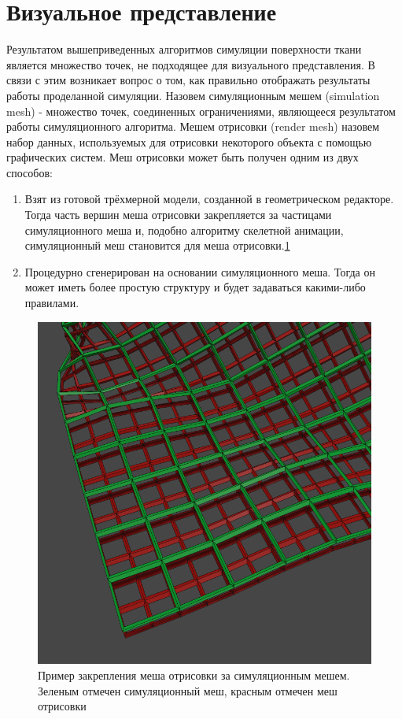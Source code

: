 \section{Визуальное представление} \label{ch3:rendering}
	Результатом вышеприведенных алгоритмов симуляции поверхности ткани является множество точек, не подходящее для визуального представления. В связи с этим возникает вопрос о том, как правильно отображать результаты работы проделанной симуляции. Назовем симуляционным мешем (simulation mesh) - множество точек, соединенных ограничениями, являющееся результатом работы симуляционного алгоритма. Мешем отрисовки (render mesh) назовем набор данных, используемых для отрисовки некоторого объекта с помощью графических систем. Меш отрисовки может быть получен одним из двух способов:
	\begin{enumerate}[1.]
		\item Взят из готовой трёхмерной модели, созданной в геометрическом редакторе. Тогда часть вершин меша отрисовки закрепляется за частицами симуляционного меша и, подобно алгоритму скелетной анимации, симуляционный меш становится  для меша отрисовки.\ref{fig:meshSkinning}
		\item Процедурно сгенерирован на основании симуляционного меша. Тогда он может иметь более простую структуру и будет задаваться какими-либо правилами.
	\end{enumerate}
	
	\begin{figure}[ht!] 
		\center
		\includegraphics [scale=0.5] {my_folder/images//simrendermesh}
		\caption{Пример закрепления меша отрисовки за симуляционным мешем. Зеленым отмечен симуляционный меш, красным отмечен меш отрисовки}
		\label{fig:meshSkinning}  
	\end{figure}
	
